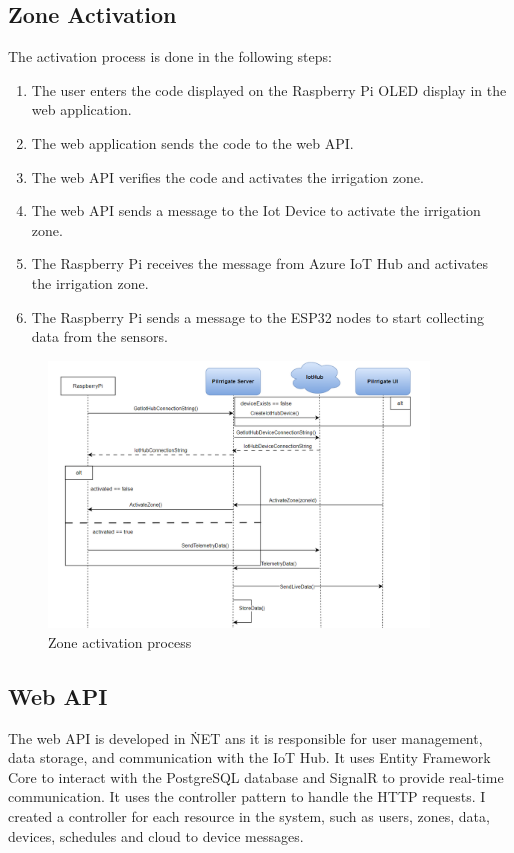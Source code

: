 \subsection{Zone Activation}

The activation process is done in the following steps:
\begin{enumerate}
    \item The user enters the code displayed on the Raspberry Pi OLED display in the web application.
    \item The web application sends the code to the web API.
    \item The web API verifies the code and activates the irrigation zone.
    \item The web API sends a message to the Iot Device to activate the irrigation zone.
    \item The Raspberry Pi receives the message from Azure IoT Hub and activates the irrigation zone.
    \item The Raspberry Pi sends a message to the ESP32 nodes to start collecting data from the sensors.
\end{enumerate}

\begin{figure}[H]
    \centering
    \includegraphics[width=0.9\textwidth]{images/activation.png}
    \caption{Zone activation process}
    \label{fig:zone-activation}
\end{figure}

\subsection{Web API}
The web API is developed in \.NET ans it is responsible
for user management, data storage, and communication with the IoT Hub.
It uses Entity Framework Core to interact with the 
PostgreSQL database and SignalR to provide real-time communication.
It uses the controller pattern to handle the HTTP requests. 
I created a controller for each resource in the system,
such as users, zones, data, devices, schedules and cloud to device messages.

